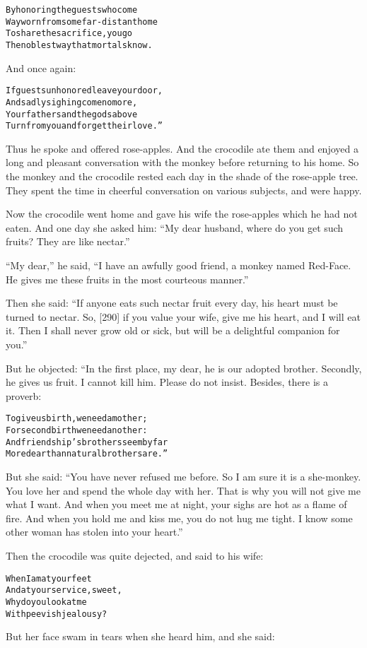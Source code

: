 \documentclass{article}
\renewenvironment{verbatim}{\begin{alltt}\normalfont\begin{centering}}{\end{centering}\end{alltt}}
\begin{document}
\begin{verbatim}
By honoring the guests who come
Wayworn from some far-distant home
To share the sacrifice, you go
The noblest way that mortals know.
\end{verbatim}
And once again:

\begin{verbatim}
If guests unhonored leave your door,
And sadly sighing come no more,
Your fathers and the gods above
Turn from you and forget their love.”
\end{verbatim}
Thus he spoke and offered rose-apples. And the crocodile ate them
and enjoyed a long and pleasant conversation with the monkey before
returning to his home. So the monkey and the crocodile rested each
day in the shade of the rose-apple tree. They spent the time in
cheerful conversation on various subjects, and were happy.

Now the crocodile went home and gave his wife the rose-apples which
he had not eaten. And one day she asked him:
``My dear husband, where do you get such fruits? They are like nectar.''

``My dear,'' he said,
``I have an awfully good friend, a monkey named Red-Face. He gives me these fruits in the most courteous manner.''

Then she said:
``If anyone eats such nectar fruit every day, his heart must be turned to nectar. So, [290] if you value your wife, give me his heart, and I will eat it. Then I shall never grow old or sick, but will be a delightful companion for you.''

But he objected: “In the first place, my dear, he is our adopted
brother. Secondly, he gives us fruit. I cannot kill him. Please do
not insist. Besides, there is a proverb:

\begin{verbatim}
To give us birth, we need a mother;
For second birth we need another:
And friendship's brothers seem by far
More dear than natural brothers are.”
\end{verbatim}
But she said:
``You have never refused me before. So I am sure it is a she-monkey. You love her and spend the whole day with her. That is why you will not give me what I want. And when you meet me at night, your sighs are hot as a flame of fire. And when you hold me and kiss me, you do not hug me tight. I know some other woman has stolen into your heart.''

Then the crocodile was quite dejected, and said to his wife:

\begin{verbatim}
When I am at your feet
And at your service, sweet,
Why do you look at me
With peevish jealousy?
\end{verbatim}
But her face swam in tears when she heard him, and she said:
\end{document}
